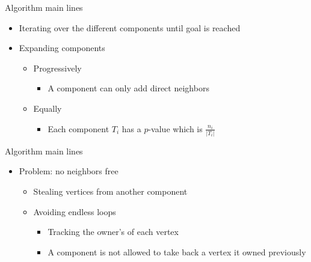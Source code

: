 \begin{frame}{Algorithm main lines}
  \begin{itemize}
  \item Iterating over the different components until goal is reached
  \item Expanding components
    \begin{itemize}
    \item Progressively
      \begin{itemize}
      \item A component can only add direct neighbors
      \end{itemize}
    \item Equally
      \begin{itemize}
      \item Each component $T_i$ has a $p$-value which is $\frac{n_i}{|T_i|}$
      \end{itemize}
    \end{itemize}
  \end{itemize}
  \begin{center}
  \end{center}
\end{frame}

\begin{frame}{Algorithm main lines}
  \begin{itemize}
  \item Problem: no neighbors free
    \begin{itemize}
    \item Stealing vertices from another component
    \item Avoiding endless loops
      \begin{itemize}
      \item Tracking the owner's of each vertex
      \item A component is not allowed to take back a vertex it owned previously
      \end{itemize}
    \end{itemize}
  \end{itemize}
  \begin{center}
  \end{center}
\end{frame}

